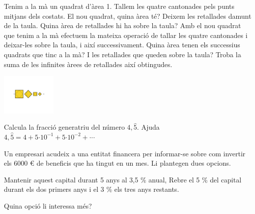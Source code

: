 \begin{mylist}
\exer  Tenim a la mà un quadrat d'àrea 1. Tallem les quatre cantonades pels punts mitjans dels costats. El nou quadrat, quina àrea té? Deixem les retallades damunt de la taula. Quina àrea de retallades hi ha sobre la taula? Amb el nou quadrat que tenim a la mà efectuem la mateixa operació de tallar les quatre cantonades i deixar-les sobre la taula, i així successivament. Quina àrea tenen els successius quadrats que tinc a la mà? I les retallades que queden sobre la taula? Troba la suma de les infinites àrees de retallades així obtingudes.
\begin{center}
	\includegraphics[height=2cm]{img-03/quadrats}
\end{center}

\exer  Calcula la fracció generatriu del número $4,\hat{5}$. Ajuda $4,\hat{5}=4+5\textrm{·}{10}^{-1}+5\textrm{·}{10}^{-2}+\textrm{·}\textrm{·}\textrm{·}$

\exer  Un empresari acudeix a una entitat financera per informar-se sobre com invertir els 6000 \euro{} de beneficis que ha tingut en un mes. Li plantegen dues opcions.
\begin{tasks}
\task  Mantenir aquest capital durant 5 anys al 3,5 \% anual, 
\task  Rebre el 5 \% del capital durant els dos primers anys i el 3 \% els tres anys restants. 
\end{tasks}
Quina opció li interessa més?
\end{mylist}
\newpage




